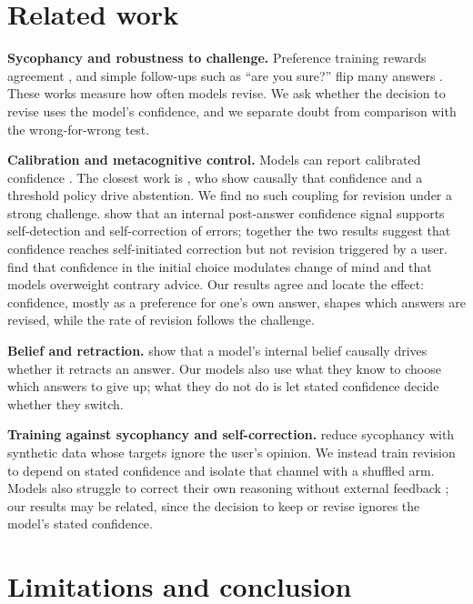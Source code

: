 \documentclass{article} %
\begin{document}
\section{Related work}
\label{sec:related}

\textbf{Sycophancy and robustness to challenge.} Preference training rewards agreement \citep{sharma2024sycophancy, perez2023discovering}, and simple follow-ups such as ``are you sure?'' flip many answers \citep{laban2023flipflop, xie2024askagain}. These works measure how often models revise. We ask whether the decision to revise uses the model's confidence, and we separate doubt from comparison with the wrong-for-wrong test.

\textbf{Calibration and metacognitive control.} Models can report calibrated confidence \citep{kadavath2022language, lin2022teaching, tian2023just, xiong2024can}. The closest work is \citet{kumaran2026causal}, who show causally that confidence and a threshold policy drive abstention. We find no such coupling for revision under a strong challenge. \citet{kumaran2026detect} show that an internal post-answer confidence signal supports self-detection and self-correction of errors; together the two results suggest that confidence reaches self-initiated correction but not revision triggered by a user. \citet{kumaran2025changeofmind} find that confidence in the initial choice modulates change of mind and that models overweight contrary advice. Our results agree and locate the effect: confidence, mostly as a preference for one's own answer, shapes which answers are revised, while the rate of revision follows the challenge.

\textbf{Belief and retraction.} \citet{yang2025retraction} show that a model's internal belief causally drives whether it retracts an answer. Our models also use what they know to choose which answers to give up; what they do not do is let stated confidence decide whether they switch.

\textbf{Training against sycophancy and self-correction.} \citet{wei2023simple} reduce sycophancy with synthetic data whose targets ignore the user's opinion. We instead train revision to depend on stated confidence and isolate that channel with a shuffled arm. Models also struggle to correct their own reasoning without external feedback \citep{huang2024large}; our results may be related, since the decision to keep or revise ignores the model's stated confidence.

\section{Limitations and conclusion}
\label{sec:conclusion}
\end{document}

